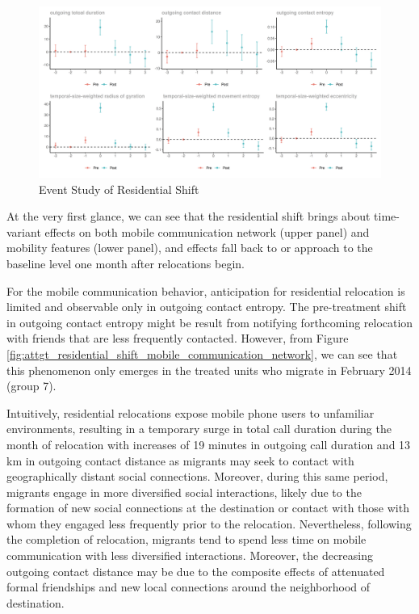 \begin{figure}[h!]
\centering
\caption{Event Study of Residential Shift}
\vspace{0.1cm}

\includegraphics[scale=0.49]{figures/csdid/residential_shift.png}

\label{fig:event_study_residential_shift}
\end{figure}

At the very first glance, we can see that the residential shift brings about time-variant effects on both mobile communication network (upper panel) and mobility features (lower panel), and effects fall back to or approach to the baseline level one month after relocations begin.

For the mobile communication behavior, anticipation for residential relocation is limited and observable only in outgoing contact entropy.
The pre-treatment shift in outgoing contact entropy might be result from notifying forthcoming relocation with friends that are less frequently contacted.
However, from Figure \ref{fig:attgt_residential_shift_mobile_communication_network}, we can see that this phenomenon only emerges in the treated units who migrate in February 2014 (group 7).

Intuitively, residential relocations expose mobile phone users to unfamiliar environments, resulting in a temporary surge in total call duration during the month of relocation with increases of 19 minutes in outgoing call duration and 13 km in outgoing contact distance as migrants may seek to contact with geographically distant social connections.
Moreover, during this same period, migrants engage in more diversified social interactions, likely due to the formation of new social connections at the destination or contact with those with whom they engaged less frequently prior to the relocation.
Nevertheless, following the completion of relocation, migrants tend to spend less time on mobile communication with less diversified interactions. Moreover, the decreasing outgoing contact distance may be due to the composite effects of attenuated formal friendships and new local connections around the neighborhood of destination.


